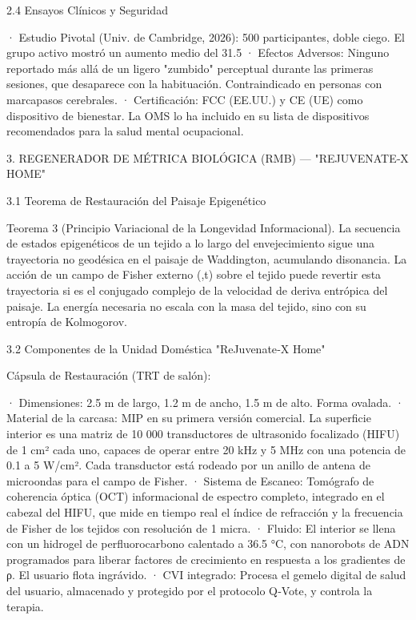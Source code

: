 \documentclass[12pt,a4paper]{book}
\begin{document}
2.4 Ensayos Clínicos y Seguridad

· Estudio Pivotal (Univ. de Cambridge, 2026): 500 participantes, doble ciego. El grupo activo mostró un aumento medio del 31.5%
· Efectos Adversos: Ninguno reportado más allá de un ligero "zumbido" perceptual durante las primeras sesiones, que desaparece con la habituación. Contraindicado en personas con marcapasos cerebrales.
· Certificación: FCC (EE.UU.) y CE (UE) como dispositivo de bienestar. La OMS lo ha incluido en su lista de dispositivos recomendados para la salud mental ocupacional.

3. REGENERADOR DE MÉTRICA BIOLÓGICA (RMB) — "REJUVENATE‑X HOME"

3.1 Teorema de Restauración del Paisaje Epigenético

Teorema 3 (Principio Variacional de la Longevidad Informacional). La secuencia de estados epigenéticos de un tejido a lo largo del envejecimiento sigue una trayectoria no geodésica en el paisaje de Waddington, acumulando disonancia. La acción de un campo de Fisher externo  (,t)  sobre el tejido puede revertir esta trayectoria si    es el conjugado complejo de la velocidad de deriva entrópica del paisaje. La energía necesaria no escala con la masa del tejido, sino con su entropía de Kolmogorov.

3.2 Componentes de la Unidad Doméstica "ReJuvenate‑X Home"

Cápsula de Restauración (TRT de salón):

· Dimensiones: 2.5 m de largo, 1.2 m de ancho, 1.5 m de alto. Forma ovalada.
· Material de la carcasa: MIP en su primera versión comercial. La superficie interior es una matriz de 10 000 transductores de ultrasonido focalizado (HIFU) de 1 cm² cada uno, capaces de operar entre 20 kHz y 5 MHz con una potencia de 0.1 a 5 W/cm². Cada transductor está rodeado por un anillo de antena de microondas para el campo de Fisher.
· Sistema de Escaneo: Tomógrafo de coherencia óptica (OCT) informacional de espectro completo, integrado en el cabezal del HIFU, que mide en tiempo real el índice de refracción y la frecuencia de Fisher de los tejidos con resolución de 1 micra.
· Fluido: El interior se llena con un hidrogel de perfluorocarbono calentado a 36.5 °C, con nanorobots de ADN programados para liberar factores de crecimiento en respuesta a los gradientes de ρ. El usuario flota ingrávido.
· CVI integrado: Procesa el gemelo digital de salud del usuario, almacenado y protegido por el protocolo Q‑Vote, y controla la terapia.
\end{document}
